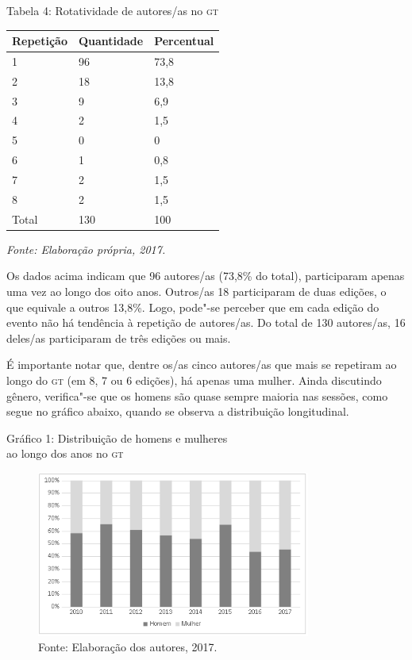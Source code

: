 \begin{center}
Tabela 4: Rotatividade de autores/as no \textsc{gt}
\end{center}

\begin{center}
\centering
\begin{tabular}{|l|l|l|}
\hline
\textbf{Repetição} & \textbf{Quantidade} & \textbf{Percentual} \\ \hline
1 & 96 & 73,8 \\ \hline
2 & 18 & 13,8 \\ \hline
3 & 9 & 6,9 \\ \hline
4 & 2 & 1,5 \\ \hline
5 & 0 & 0 \\ \hline
6 & 1 & 0,8 \\ \hline
7 & 2 & 1,5 \\ \hline
8 & 2 & 1,5 \\ \hline
Total & 130 & 100 \\ \hline
\end{tabular}
\end{center}

\begin{center}
{\footnotesize\emph{Fonte: Elaboração própria, 2017.}}
\end{center}

Os dados acima indicam que 96 autores/as (73,8\% do total), participaram
apenas uma vez ao longo dos oito anos. Outros/as 18 participaram de duas
edições, o que equivale a outros 13,8\%. Logo, pode"-se perceber que em
cada edição do evento não há tendência à repetição de autores/as. Do
total de 130 autores/as, 16 deles/as participaram de três edições ou
mais.

É importante notar que, dentre os/as cinco autores/as que mais se
repetiram ao longo do \textsc{gt} (em 8, 7 ou 6 edições), há apenas uma mulher.
Ainda discutindo gênero, verifica"-se que os homens são quase sempre
maioria nas sessões, como segue no gráfico abaixo, quando se observa a
distribuição longitudinal.

\begin{center}
Gráfico 1: Distribuição de homens e mulheres\\ ao longo dos anos no \textsc{gt}
\end{center}

\begin{figure}[!ht]
\centering
 \includegraphics[width=90mm]{./imgs/graf3_1.png}
\caption{Fonte: Elaboração dos autores, 2017.}
\end{figure}

